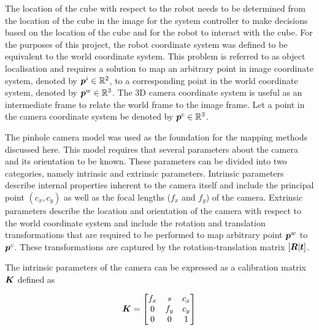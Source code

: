 The location of the cube with respect to the robot needs to be determined from the location of the cube in the image for the system controller to make decisions based on the location of the cube and for the robot to interact with the cube. For the purposes of this project, the robot coordinate system was defined to be equivalent to the world coordinate system. This problem is referred to as object localisation and requires a solution to map an arbitrary point in image coordinate system, denoted by $\bm{p}^i\in\mathbb{R}^2$, to a corresponding point in the world coordinate system, denoted by $\bm{p}^w\in\mathbb{R}^3$. The 3D camera coordinate system is useful as an intermediate frame to relate the world frame to the image frame. Let a point in the camera coordinate system be denoted by $\bm{p}^c\in\mathbb{R}^3$.


The pinhole camera model was used as the foundation for the mapping methods discussed here. This model requires that several parameters about the camera and its orientation to be known. These parameters can be divided into two categories, namely intrinsic and extrinsic parameters. Intrinsic parameters describe internal properties inherent to the camera itself and include the principal point $(c_x,c_y)$ as well as the focal lengths ($f_x$ and $f_y$) of the camera. Extrinsic parameters describe the location and orientation of the camera with respect to the world coordinate system and include the rotation and translation transformations that are required to be performed to map arbitrary point $\bm{p}^w$ to $\bm{p}^c$. These transformations are captured by the rotation-translation matrix $[\bm{R}|\bm{t}]$.


The intrinsic parameters of the camera can be expressed as a calibration matrix $\bm{K}$ defined as

\begin{equation}
	\bm{K}=
	\begin{bmatrix}
		f_x & s & c_x \\ 
		0 & f_y & c_y \\ 
		0 & 0 & 1
	\end{bmatrix}
	\label{eqn:calibration-matrix}
\end{equation}

